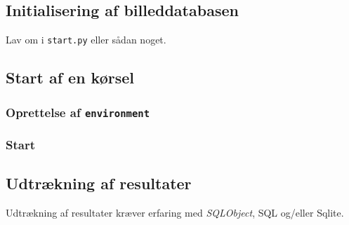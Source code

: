 {\subsection{Initialisering af billeddatabasen}
Lav om i \texttt{start.py} eller sådan noget.

\subsection{Start af en kørsel}
\subsubsection{Oprettelse af \texttt{environment}}

\subsubsection{Start}

\subsection{Udtrækning af resultater}
Udtrækning af resultater kræver erfaring med \emph{SQLObject}, SQL
og/eller Sqlite.

}

